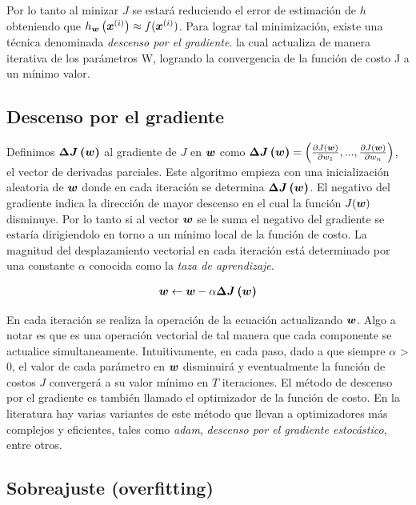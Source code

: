 Por lo tanto al minizar $J$ se estará reduciendo el error de estimación de $h$
obteniendo que $h_{\boldsymbol{w}}\left( \boldsymbol{x}^{(i)} \right) \approx f(\boldsymbol{x}^{(i)})$. Para
lograr tal minimización, existe una técnica denominada \emph{descenso por el
gradiente}. la cual actualiza de manera iterativa de los parámetros W, logrando
la convergencia de la función de costo J a un mínimo valor.

\subsection{Descenso por el gradiente}

Definimos $\boldsymbol{\Delta J\left( w \right)}$ al gradiente de $J$ en $\boldsymbol{w}$
como $\boldsymbol{\Delta J\left( \boldsymbol{w} \right)} = \left(\frac{\partial
J(\boldsymbol{w})}{\partial w_1}, ..., \frac{\partial J(\boldsymbol{w})}{\partial w_n}
\right)$, el vector de derivadas parciales. Este algoritmo empieza con una
inicialización aleatoria de $\boldsymbol{w}$ donde en cada iteración se determina
$\boldsymbol{\Delta J\left( w \right)}$. El negativo del gradiente indica la dirección
de mayor descenso en el cual la función $J(\boldsymbol{w})$ disminuye. Por lo tanto si
al vector $\boldsymbol{w}$ se le suma el negativo del gradiente se estaría
dirigiendolo en torno a un mínimo local de la función de costo. La magnitud del
desplazamiento vectorial en cada iteración está determinado por una constante
$\alpha$ conocida como la \emph{taza de aprendizaje}.

\begin{align}
    \boldsymbol{w} \leftarrow \boldsymbol{w} - \alpha \boldsymbol{\Delta J\left( w \right)}
\end{align}

En cada iteración se realiza la operación de la ecuación actualizando
$\boldsymbol{w}$. Algo a notar es que es una operación vectorial de tal manera que
cada componente se actualice simultaneamente. Intuitivamente, en cada paso, dado
a que siempre $\alpha$ > 0, el valor de cada parámetro en $\boldsymbol{w}$ disminuirá
y eventualmente la función de costos $J$ convergerá a su valor mínimo en $T$
iteraciones. El método de descenso por el gradiente es también llamado el
optimizador de la función de costo. En la literatura hay varias variantes de
este método que llevan a optimizadores más complejos y eficientes, tales como
\emph{adam}, \emph{descenso por el gradiente estocástico}, entre otros.

\subsection{Sobreajuste (overfitting)}


